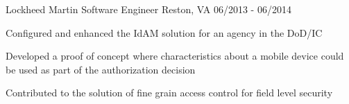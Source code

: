 \begin{cventries}
  \cventry
    {Lockheed Martin} %
    {Software Engineer} %
    {Reston, VA} %
    {06/2013 - 06/2014} %
    {
      \begin{cvitems} %
        \item {Configured and enhanced the IdAM solution for an agency in the DoD/IC}
        \item {Developed a proof of concept where characteristics about a mobile device could be used as part of the authorization decision}
        \item {Contributed to the solution of fine grain access control for field level security}
      \end{cvitems}
    }

\end{cventries}
